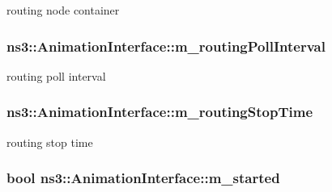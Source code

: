 routing node container 

\subsubsection[{\texorpdfstring{m\+\_\+routing\+Poll\+Interval}{m_routingPollInterval}}]{ ns3\+::\+Animation\+Interface\+::m\+\_\+routing\+Poll\+Interval\hspace{0.3cm}{\ttfamily [private]}}\hypertarget{classns3_1_1AnimationInterface_a16bea9b8d92eaa954ea0fc7d067d4ffd}{}\label{classns3_1_1AnimationInterface_a16bea9b8d92eaa954ea0fc7d067d4ffd}


routing poll interval 

\subsubsection[{\texorpdfstring{m\+\_\+routing\+Stop\+Time}{m_routingStopTime}}]{ ns3\+::\+Animation\+Interface\+::m\+\_\+routing\+Stop\+Time\hspace{0.3cm}{\ttfamily [private]}}\hypertarget{classns3_1_1AnimationInterface_aa0e26a1672f03b761f1633814444a5b9}{}\label{classns3_1_1AnimationInterface_aa0e26a1672f03b761f1633814444a5b9}


routing stop time 

\subsubsection[{\texorpdfstring{m\+\_\+started}{m_started}}]{\setlength{\rightskip}{0pt plus 5cm}bool ns3\+::\+Animation\+Interface\+::m\+\_\+started\hspace{0.3cm}{\ttfamily [private]}}\hypertarget{classns3_1_1AnimationInterface_aa8a6ce3aa7ad35aa7c5313f2834825f9}{}\label{classns3_1_1AnimationInterface_aa8a6ce3aa7ad35aa7c5313f2834825f9}


